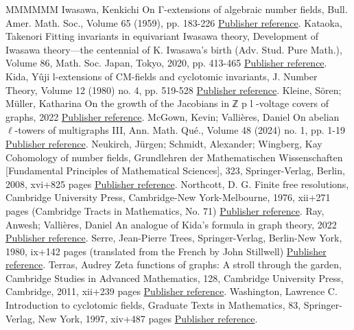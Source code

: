 \begin{thebibliography}{MMMMMM}
 Iwasawa, Kenkichi On Γ-extensions of algebraic number fields, Bull. Amer. Math. Soc., Volume 65 (1959), pp. 183-226 \href{https://alco.centre-mersenne.org/articles/10.5802/alco.355/#Iwa59}{Publisher reference}.
 Kataoka, Takenori Fitting invariants in equivariant Iwasawa theory, Development of Iwasawa theory—the centennial of K. Iwasawa’s birth (Adv. Stud. Pure Math.), Volume 86, Math. Soc. Japan, Tokyo, 2020, pp. 413-465 \href{https://alco.centre-mersenne.org/articles/10.5802/alco.355/#Kata_05}{Publisher reference}.
 Kida, Yûji l-extensions of CM-fields and cyclotomic invariants, J. Number Theory, Volume 12 (1980) no. 4, pp. 519-528 \href{https://alco.centre-mersenne.org/articles/10.5802/alco.355/#Kid80}{Publisher reference}.
 Kleine, Sören; Müller, Katharina On the growth of the Jacobians in ℤ p l -voltage covers of graphs, 2022 \href{https://alco.centre-mersenne.org/articles/10.5802/alco.355/#KM22}{Publisher reference}.
 McGown, Kevin; Vallières, Daniel On abelian \(\ell\)-towers of multigraphs III, Ann. Math. Qué., Volume 48 (2024) no. 1, pp. 1-19 \href{https://alco.centre-mersenne.org/articles/10.5802/alco.355/#MV21b}{Publisher reference}.
 Neukirch, Jürgen; Schmidt, Alexander; Wingberg, Kay Cohomology of number fields, Grundlehren der Mathematischen Wissenschaften [Fundamental Principles of Mathematical Sciences], 323, Springer-Verlag, Berlin, 2008, xvi+825 pages \href{https://alco.centre-mersenne.org/articles/10.5802/alco.355/#NSW08}{Publisher reference}.
 Northcott, D. G. Finite free resolutions, Cambridge University Press, Cambridge-New York-Melbourne, 1976, xii+271 pages (Cambridge Tracts in Mathematics, No. 71) \href{https://alco.centre-mersenne.org/articles/10.5802/alco.355/#Nor76}{Publisher reference}.
 Ray, Anwesh; Vallières, Daniel An analogue of Kida’s formula in graph theory, 2022 \href{https://alco.centre-mersenne.org/articles/10.5802/alco.355/#RV22}{Publisher reference}.
 Serre, Jean-Pierre Trees, Springer-Verlag, Berlin-New York, 1980, ix+142 pages (translated from the French by John Stillwell) \href{https://alco.centre-mersenne.org/articles/10.5802/alco.355/#Ser80}{Publisher reference}.
 Terras, Audrey Zeta functions of graphs: A stroll through the garden, Cambridge Studies in Advanced Mathematics, 128, Cambridge University Press, Cambridge, 2011, xii+239 pages \href{https://alco.centre-mersenne.org/articles/10.5802/alco.355/#Ter11}{Publisher reference}.
 Washington, Lawrence C. Introduction to cyclotomic fields, Graduate Texts in Mathematics, 83, Springer-Verlag, New York, 1997, xiv+487 pages \href{https://alco.centre-mersenne.org/articles/10.5802/alco.355/#Was97}{Publisher reference}.
\end{thebibliography}
